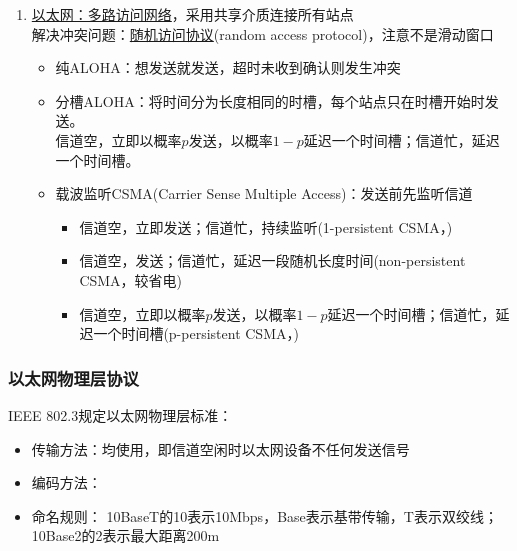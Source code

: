 \begin{enumerate}
\item \underline{以太网：多路访问网络}，采用共享介质连接所有站点\\
解决冲突问题：\underline{随机访问协议}(random access protocol)，注意不是滑动窗口
\begin{itemize}
\item 纯ALOHA：想发送就发送，超时未收到确认则发生冲突
\item 分槽ALOHA：将时间分为长度相同的时槽，每个站点只在时槽开始时发送。\\
信道空，立即以概率$p$发送，以概率$1-p$延迟一个时间槽；信道忙，延迟一个时间槽。
\item 载波监听CSMA(Carrier Sense Multiple Access)：发送前先监听信道
\begin{itemize}
	\item 信道空，立即发送；信道忙，持续监听(1-persistent CSMA，)
	\item 信道空，发送；信道忙，延迟一段随机长度时间(non-persistent CSMA，较省电)
	\item 信道空，立即以概率$p$发送，以概率$1-p$延迟一个时间槽；信道忙，延迟一个时间槽(p-persistent CSMA，)
\end{itemize}
\end{itemize}
\end{enumerate}

\subsubsection{以太网物理层协议}
IEEE 802.3规定以太网物理层标准：
\begin{itemize}
	\item 传输方法：均使用，即信道空闲时以太网设备不任何发送信号
	\item 编码方法：
	\item 命名规则： 10BaseT的10表示10Mbps，Base表示基带传输，T表示双绞线；10Base2的2表示最大距离200m
\end{itemize}

